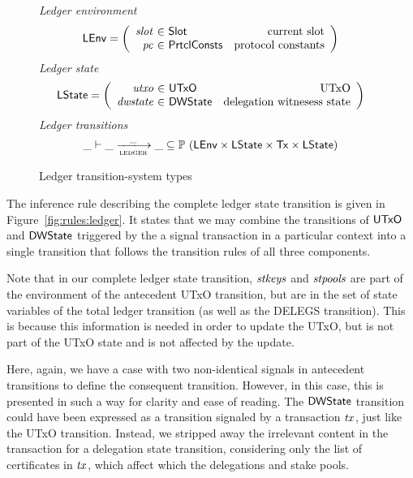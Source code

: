 \documentclass[11pt,a4paper]{article}
\newcommand{\Tx}{\type{Tx}}
\newcommand{\UTxO}{\type{UTxO}}
\newcommand{\PrtclConsts}{\type{PrtclConsts}}
\newcommand{\Slot}{\type{Slot}}
\newcommand{\DWState}{\type{DWState}}
\newcommand{\LEnv}{\type{LEnv}}
\newcommand{\LState}{\type{LState}}
\theoremstyle{definition}
\theoremstyle{definition}
\begin{document}
\begin{figure}
  \emph{Ledger environment}
  \begin{equation*}
    \LEnv =
    \left(
      \begin{array}{r@{~\in~}lr}
        \var{slot} & \Slot & \text{current slot}\\
        \var{pc} & \PrtclConsts & \text{protocol constants}\\
      \end{array}
    \right)
  \end{equation*}
  \emph{Ledger state}
  \begin{equation*}
    \LState =
    \left(
      \begin{array}{r@{~\in~}lr}
        \var{utxo} & \UTxO & \text{UTxO}\\
        \var{dwstate} & \DWState & \text{delegation witnesess state}\\
      \end{array}
    \right)
  \end{equation*}
  \emph{Ledger transitions}
  \begin{equation*}
    \_ \vdash
    \var{\_} \trans{ledger}{\_} \var{\_}
    \subseteq \powerset (\LEnv \times \LState \times \Tx \times \LState)
  \end{equation*}
  \caption{Ledger transition-system types}
  \label{fig:ts-types:ledger}
\end{figure}


The inference rule describing the complete ledger state transition is given in
Figure~\ref{fig:rules:ledger}. It states that we may combine the transitions
of $\UTxO$ and $\DWState$ triggered by the a signal transaction
in a particular context into a single transition that follows the transition
rules of all three components.

Note that in our complete ledger state transition, $\mathit{stkeys}$ and
$\mathit{stpools}$ are part of the environment of the antecedent UTxO transition,
but are in the set of state variables of the total ledger transition (as well
as the DELEGS transition). This is because this information is needed in order
to update the UTxO, but is not part of the UTxO state and is not affected by the
update.

Here, again, we have a case with two non-identical signals in antecedent
transitions to define the consequent transition. However, in this case,
this is presented in such a way for clarity and ease of reading. The $\DWState$
transition could have been expressed as a transition signaled by a transaction
$\mathit{tx}$, just like the UTxO transition. Instead, we stripped away the
irrelevant content in the transaction for a delegation state transition,
considering only the list of certificates in $\mathit{tx}$, which affect which the delegations
and stake pools.
\end{document}
